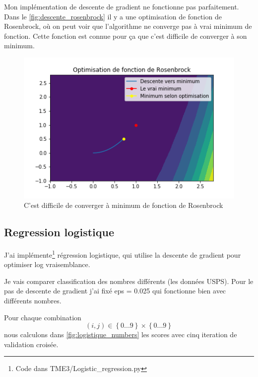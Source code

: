 \documentclass[a4paper,12pt]{article}
\begin{document}
Mon implémentation de descente de gradient ne fonctionne pas parfaitement.
Dans le \autoref{fig:descente_rosenbrock} il y a une optimisation de fonction de Rosenbrock, où on peut voir que l'algorithme ne converge pas à vrai minimum de fonction.
Cette fonction est connue pour ça que c'est difficile de converger à son minimum.

\begin{figure}[h!]
\caption{C'est difficile de converger à minimum de fonction de Rosenbrock}
\label{fig:descente_rosenbrock}
\centering
\includegraphics[width=0.4\linewidth]{images/tme3/descente_rosenbrock.png}
\end{figure}%

\subsection{Regression logistique}

J'ai implémente\footnote{Code dans TME3\slash Logistic\_regression.py}
régression logistique, qui utilise la descente de gradient pour optimiser log vraisemblance.

Je vais comparer classification des nombres différents (les données USPS).
Pour le pas de descente de gradient j'ai fixé eps = 0.025 qui fonctionne bien avec différents nombres.

Pour chaque combination $$\left ( i,j \right ) \in \left \{ 0...9 \right \} \times  \left \{ 0...9 \right \}$$
nous calculons dans \autoref{fig:logistique_numbers} les scores avec cinq iteration de validation croisée.
\end{document}
